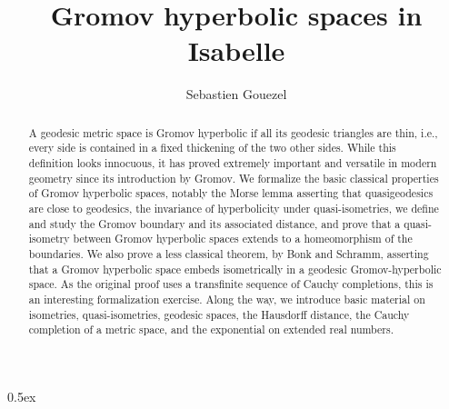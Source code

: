 \documentclass[11pt,a4paper]{article}
\begin{document}
\title{Gromov hyperbolic spaces in Isabelle}
\author{Sebastien Gouezel}
\date{}
\maketitle

\begin{abstract}
A geodesic metric space is Gromov hyperbolic if all its geodesic triangles
are thin, i.e., every side is contained in a fixed thickening of the two
other sides. While this definition looks innocuous, it has proved extremely
important and versatile in modern geometry since its introduction by
Gromov. We formalize the basic classical properties of Gromov hyperbolic
spaces, notably the Morse lemma asserting that quasigeodesics are close to
geodesics, the invariance of hyperbolicity under quasi-isometries, we
define and study the Gromov boundary and its associated distance, and prove
that a quasi-isometry between Gromov hyperbolic spaces extends to a
homeomorphism of the boundaries. We also prove a less classical theorem, by
Bonk and Schramm, asserting that a Gromov hyperbolic space embeds
isometrically in a geodesic Gromov-hyperbolic space. As the original proof
uses a transfinite sequence of Cauchy completions, this is an interesting
formalization exercise. Along the way, we introduce basic material on
isometries, quasi-isometries, geodesic spaces, the Hausdorff distance, the
Cauchy completion of a metric space, and the exponential on extended real
numbers.
\end{abstract}

\tableofcontents

\parindent 0pt\parskip 0.5ex





\end{document}
